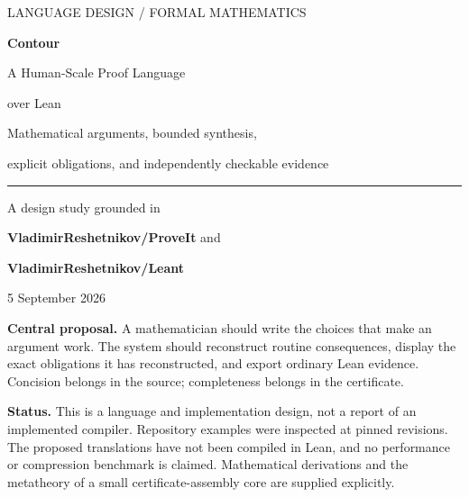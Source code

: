 \documentclass[11pt,a4paper]{article}
\begin{document}
\begin{titlepage}
\vspace*{14mm}
{\sffamily\color{accent}\large LANGUAGE DESIGN / FORMAL MATHEMATICS\par}
\vspace{9mm}
{\Huge\bfseries Contour\par}
\vspace{4mm}
{\LARGE A Human-Scale Proof Language\par}
{\LARGE over Lean\par}
\vspace{8mm}
{\large Mathematical arguments, bounded synthesis,\par
 explicit obligations, and independently checkable evidence\par}
\vspace{12mm}
\rule{\textwidth}{0.6pt}
\vspace{4mm}
{\large A design study grounded in\par
\textbf{VladimirReshetnikov/ProveIt} and\par
\textbf{VladimirReshetnikov/Leant}\par}
\vspace{9mm}
5 September 2026\par
\vfill
\begin{principle}
\textbf{Central proposal.} A mathematician should write the choices that make an argument work. The system should reconstruct routine consequences, display the exact obligations it has reconstructed, and export ordinary Lean evidence. Concision belongs in the source; completeness belongs in the certificate.
\end{principle}
\vspace{5mm}
{\small\textbf{Status.} This is a language and implementation design, not a report of an implemented compiler. Repository examples were inspected at pinned revisions. The proposed translations have not been compiled in Lean, and no performance or compression benchmark is claimed. Mathematical derivations and the metatheory of a small certificate-assembly core are supplied explicitly.}
\end{titlepage}
\end{document}
